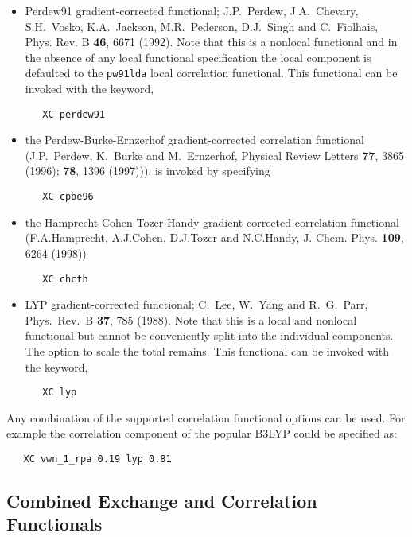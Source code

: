 \begin{itemize}
\item Perdew91 gradient-corrected functional;  J.P.~Perdew,
  J.A.~Chevary, S.H.~Vosko, K.A.~Jackson, M.R.~Pederson, D.J.~Singh
  and C.~Fiolhais, Phys. Rev. B {\bf 46}, 6671 (1992). Note that this
  is a nonlocal functional and in the absence of any local functional 
  specification the local component is defaulted to the \verb+pw91lda+ local 
  correlation functional.  This functional can be invoked with the keyword,
\begin{verbatim}
   XC perdew91
\end{verbatim}

\item the Perdew-Burke-Ernzerhof gradient-corrected correlation functional \\
 (J.P.~Perdew, K.~Burke and M.~Ernzerhof, Physical Review Letters
{\bf 77}, 3865 (1996); {\bf 78}, 1396 (1997))), is invoked by specifying

\begin{verbatim}
   XC cpbe96
\end{verbatim}

\item the Hamprecht-Cohen-Tozer-Handy  gradient-corrected correlation 
functional
(F.A.Hamprecht, A.J.Cohen, D.J.Tozer and N.C.Handy, 
    J. Chem. Phys. {\bf 109}, 6264 (1998))
\begin{verbatim}
   XC chcth
\end{verbatim}

\item LYP gradient-corrected functional; C.~Lee, W.~Yang and
   R.~G.~Parr, Phys.~Rev.~B {\bf 37}, 785 (1988).  Note that this
  is a local and nonlocal functional but cannot be conveniently split
  into the individual components.  The option to scale the total remains.
  This functional can be invoked with the keyword,
\begin{verbatim}
   XC lyp
\end{verbatim}

\end{itemize}

\fussy

Any combination of the supported correlation functional options can be
used.  For example the correlation component of the popular B3LYP
could be specified as:
\begin{verbatim}
   XC vwn_1_rpa 0.19 lyp 0.81
\end{verbatim}

  
\subsection{Combined Exchange and Correlation Functionals}

